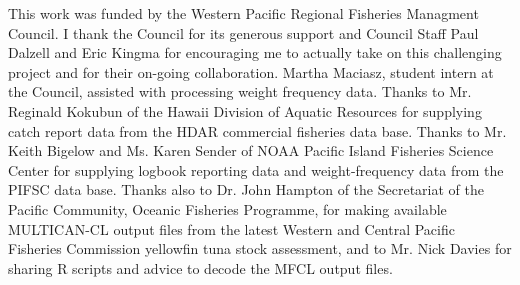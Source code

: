\documentclass[12pt,letterpaper]{article}
\begin{document}
\clearpage
This work was funded by the Western Pacific Regional Fisheries
Managment Council. I thank the Council for its generous support and
Council Staff Paul Dalzell and Eric Kingma for encouraging me to
actually take on this challenging project and for their on-going
collaboration.
Martha Maciasz, student intern at the Council, assisted with
processing weight frequency data.
Thanks to Mr. Reginald Kokubun of the Hawaii Division of Aquatic
Resources for supplying catch report data from the HDAR commercial
fisheries data base.
Thanks to Mr. Keith Bigelow and Ms. Karen Sender of NOAA Pacific
Island Fisheries Science Center for supplying logbook reporting data and
weight-frequency data from the PIFSC data base.
Thanks also to Dr. John Hampton of the Secretariat of the Pacific
Community, Oceanic Fisheries Programme, for making available
MULTICAN-CL output files from the latest Western and Central Pacific
Fisheries Commission yellowfin tuna stock assessment, and to Mr. Nick
Davies for sharing R scripts and advice to decode the MFCL output files.
\end{document}
